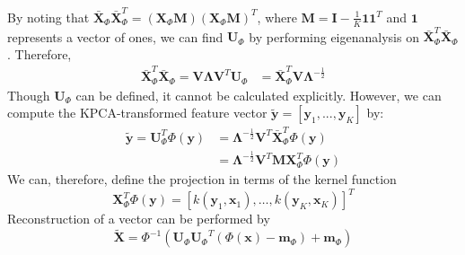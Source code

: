 By noting that $\boldsymbol{\bar{X}}_\Phi \boldsymbol{\bar{X}}_\Phi^T = (\boldsymbol{X}_\Phi \boldsymbol{M}) (\boldsymbol{X}_\Phi \boldsymbol{M})^T$, where $\boldsymbol{M} = \boldsymbol{I} - \frac{1}{K} \boldsymbol{1} \boldsymbol{1}^T$ and $\boldsymbol{1}$ represents a vector of ones, we can find $\boldsymbol{U}_\Phi$ by performing eigenanalysis on $\bar{\boldsymbol{X}}_\Phi^T \bar{\boldsymbol{X}}_\Phi$. Therefore,
\begin{equation}
    \begin{aligned}\label{eq:x-bar-corr}
        \boldsymbol{\bar{X}}_\Phi^T \boldsymbol{\bar{X}}_\Phi = \boldsymbol{V} \boldsymbol{\Lambda} \boldsymbol{V}^T \boldsymbol{U}_{\Phi} &= \boldsymbol{\bar{X}}_\Phi^T \boldsymbol{V} \boldsymbol{\Lambda}^{-\frac{1}{2}}
    \end{aligned}
\end{equation}
Though $\boldsymbol{U}_\Phi$ can be defined, it cannot be calculated explicitly. However, we can compute the KPCA-transformed feature vector $\boldsymbol{\tilde{y}} = [\boldsymbol{y}_1, ..., \boldsymbol{y}_K]$ by:
\begin{equation}
    \begin{aligned}\label{eq:projections}
        \boldsymbol{\tilde{y}} = \boldsymbol{U}_\Phi^T \Phi(\boldsymbol{y}) &= \boldsymbol{\Lambda}^{-\frac{1}{2}} \boldsymbol{V}^T \boldsymbol{\bar{X}}_\Phi^T \Phi(\boldsymbol{y}) \\
        &= \boldsymbol{\Lambda}^{-\frac{1}{2}} \boldsymbol{V}^T \boldsymbol{M} \boldsymbol{X}_\Phi^T \Phi(\boldsymbol{y})
    \end{aligned}
\end{equation}
We can, therefore, define the projection in terms of the kernel function
\begin{equation}\label{eq:kernel-vector}
        \boldsymbol{X}_\Phi^T \Phi(\boldsymbol{y}) = \left[ k(\boldsymbol{y}_1, \boldsymbol{x}_1), \ldots, k(\boldsymbol{y}_K, \boldsymbol{x}_K) \right]^T
\end{equation}
Reconstruction of a vector can be performed by
\begin{equation}\label{eq:vector-reconstruction}
        \boldsymbol{\tilde{X}} = {\Phi}^{-1} \left( \boldsymbol{U}_{\Phi} {\boldsymbol{U}_{\Phi}}^T (\Phi(\boldsymbol{x}) - \boldsymbol{m}_{\Phi}) + \boldsymbol{m}_{\Phi} \right)
\end{equation}
